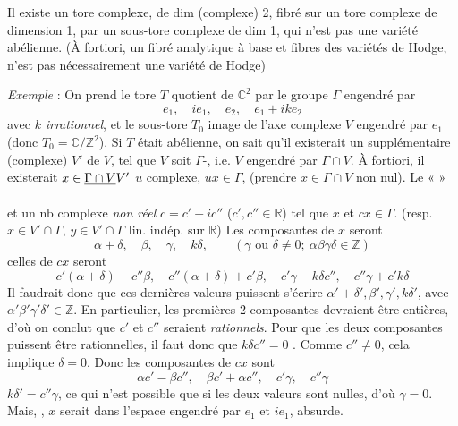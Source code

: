 \documentclass[11pt,a4paper]{article}
\begin{document}

Il existe un tore complexe, de dim (complexe) 2, fibré sur un tore complexe de
dimension 1,  par un sous-tore complexe de dim 1, qui n'est pas
une variété abélienne. (À fortiori, un fibré analytique à base et fibres des
variétés de Hodge, n'est pas nécessairement une variété de Hodge)

\emph{Exemple} : On prend le tore $T$ quotient de $\mathbb{C}^{2}$ par le groupe
$\Gamma$ engendré par
\[
e_{1}, \quad ie_{1}, \quad e_{2}, \quad e_{1} + ike_{2}
\]
avec $k$ \emph{irrationnel}, et le sous-tore $T_{0}$ image de l'axe complexe
$V$ engendré par $e_{1}$ (donc $T_{0} = \mathbb{C}/\mathbb{Z}^{2}$). Si $T$
était abélienne, on sait qu'il existerait un supplémentaire (complexe) $V'$ de
$V$, tel que $V$ soit $\Gamma$-, i.e. $V$ engendré par $\Gamma
\cap V$. À fortiori, il existerait $x \in
\struck{\Gamma \cap V} V'$  \ill{} $u$ complexe,
$ux \in \Gamma$, (prendre $x \in \Gamma \cap V$ non nul). Le
«  »


et un nb complexe \emph{non réel} $c = c' + ic''$ ($c', c'' \in \mathbb{R}$) tel
que $x$ et $cx \in \Gamma$. (resp. $x \in V' \cap \Gamma$, $y \in V' \cap
\Gamma$  lin. indép. sur $\mathbb{R}$) Les composantes de
$x$ seront
\[
\alpha + \delta, \quad \beta, \quad \gamma, \quad k\delta, \qquad (\gamma
\text{ ou } \delta \neq 0 ;\ \alpha\beta\gamma\delta \in \mathbb{Z})
\]
celles \struck{$\beta\gamma\delta$} de $cx$ seront
\[
c'(\alpha + \delta) - c''\beta, \quad c''(\alpha + \delta) + c'\beta, \quad
c'\gamma - k\delta c'', \quad c''\gamma + c'k\delta
\]
Il faudrait donc que ces dernières valeurs puissent s'écrire
$\alpha' + \delta', \beta', \gamma', k\delta'$, avec $\alpha'\beta'\gamma'\delta'
\in \mathbb{Z}$. En particulier, les premières 2 composantes devraient être
entières, d'où on conclut que $c'$ et $c''$ seraient \emph{rationnels}. Pour que
les deux   composantes puissent être
rationnelles, il faut donc que $k\delta c'' = 0$ \struck{\ill{}}. Comme $c''
\neq 0$, cela implique $\delta = 0$. Donc les composantes de $cx$ sont
\[
\alpha c' - \beta c'', \quad \beta c' + \alpha c'', \quad c'\gamma, \quad
c''\gamma
\]
\ill{} \ill{} $k\delta' = c''\gamma$, ce qui n'est possible que si les deux
valeurs sont nulles, d'où $\gamma = 0$. Mais,  , $x$ serait dans l'espace engendré par $e_{1}$ et $ie_{1}$,
absurde.
\end{document}
